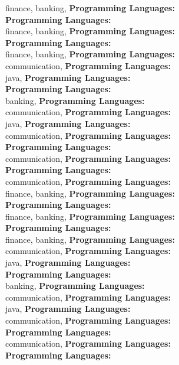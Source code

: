 finance, banking, \textbf{Programming Languages:} \\
\textbf{Programming Languages:} \\
finance, banking, \textbf{Programming Languages:} \\
\textbf{Programming Languages:} \\
finance, banking, \textbf{Programming Languages:} \\
communication, \textbf{Programming Languages:} \\
java, \textbf{Programming Languages:} \\
\textbf{Programming Languages:} \\
banking, \textbf{Programming Languages:} \\
communication, \textbf{Programming Languages:} \\
java, \textbf{Programming Languages:} \\
communication, \textbf{Programming Languages:} \\
\textbf{Programming Languages:} \\
communication, \textbf{Programming Languages:} \\
\textbf{Programming Languages:} \\
communication, \textbf{Programming Languages:} \\
finance, banking, \textbf{Programming Languages:} \\
\textbf{Programming Languages:} \\
finance, banking, \textbf{Programming Languages:} \\
\textbf{Programming Languages:} \\
finance, banking, \textbf{Programming Languages:} \\
communication, \textbf{Programming Languages:} \\
java, \textbf{Programming Languages:} \\
\textbf{Programming Languages:} \\
banking, \textbf{Programming Languages:} \\
communication, \textbf{Programming Languages:} \\
java, \textbf{Programming Languages:} \\
communication, \textbf{Programming Languages:} \\
\textbf{Programming Languages:} \\
communication, \textbf{Programming Languages:} \\
\textbf{Programming Languages:} \\
